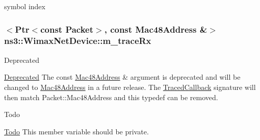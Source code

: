 symbol index 

\subsubsection[{\texorpdfstring{m\+\_\+trace\+Rx}{m_traceRx}}]{$<${\bf Ptr}$<$const {\bf Packet}$>$, const {\bf Mac48\+Address} \&$>$ ns3\+::\+Wimax\+Net\+Device\+::m\+\_\+trace\+Rx}\hypertarget{classns3_1_1WimaxNetDevice_a88710ac8dd5cdcee795372c5722be86e}{}\label{classns3_1_1WimaxNetDevice_a88710ac8dd5cdcee795372c5722be86e}
\begin{DoxyRefDesc}{Deprecated}
\item[\hyperlink{deprecated__deprecated000044}{Deprecated}]The {\ttfamily const \hyperlink{classns3_1_1Mac48Address}{Mac48\+Address} \&} argument is deprecated and will be changed to {\ttfamily \hyperlink{classns3_1_1Mac48Address}{Mac48\+Address}} in a future release. The \hyperlink{classns3_1_1TracedCallback}{Traced\+Callback} signature will then match {\ttfamily Packet\+::\+Mac48\+Address} and this typedef can be removed. \end{DoxyRefDesc}
\begin{DoxyRefDesc}{Todo}
\item[\hyperlink{todo__todo000183}{Todo}]This member variable should be private. \end{DoxyRefDesc}
